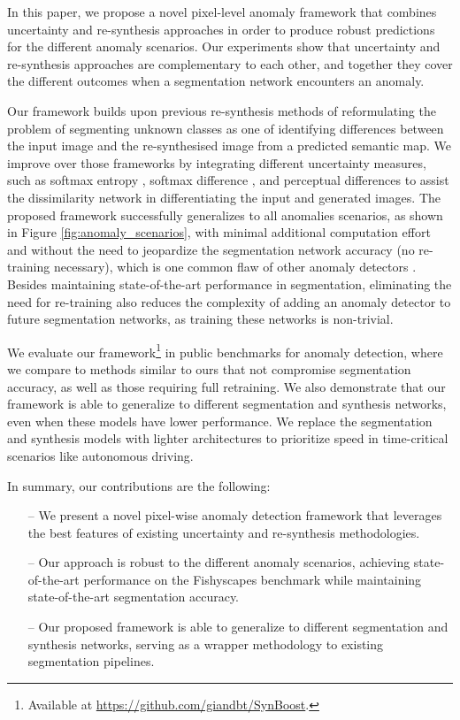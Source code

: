 \documentclass[final]{cvpr}
\begin{document}
In this paper, we propose a novel pixel-level anomaly framework that combines uncertainty and re-synthesis approaches in order to produce robust predictions for the different anomaly scenarios. Our experiments show that uncertainty and re-synthesis approaches are complementary to each other, and together they cover the different outcomes when a segmentation network encounters an anomaly.

Our framework builds upon previous re-synthesis methods \cite{epfl, master_thesis_old, synthesize_compare} of reformulating the problem of segmenting unknown classes as one of identifying differences between the input image and the re-synthesised image from a predicted semantic map. We improve over those frameworks by integrating different uncertainty measures, such as softmax entropy \cite{entropy, bayes_ensemble}, softmax difference \cite{meta}, and perceptual differences \cite{perceptual_diff, perceptual_diff_2} to assist the dissimilarity network in differentiating the input and generated images.
The proposed framework successfully generalizes to all anomalies scenarios, as shown in Figure \ref{fig:anomaly_scenarios}, with minimal additional computation effort and without the need to jeopardize the segmentation network accuracy (no re-training necessary), which is one common flaw of other anomaly detectors \cite{anomaly_score, prior_entropy, bayes_deep}. Besides maintaining state-of-the-art performance in segmentation, eliminating the need for re-training also reduces the complexity of adding an anomaly detector to future segmentation networks, as training these networks is non-trivial. 

We evaluate our framework\footnote{Available at \url{https://github.com/giandbt/SynBoost}.} in public benchmarks for anomaly detection, where we compare to methods similar to ours that not compromise segmentation accuracy, as well as those requiring full retraining. 
We also demonstrate that our framework is able to generalize to different segmentation and synthesis networks, even when these models have lower performance. We replace the segmentation and synthesis models with lighter architectures to prioritize speed in time-critical scenarios like autonomous driving. 





In summary, our contributions are the following:
\begin{itemize}
    \item[--] We present a novel pixel-wise anomaly detection framework that leverages the best features of existing uncertainty and re-synthesis methodologies.
    \item[--] Our approach is robust to the different anomaly scenarios, achieving state-of-the-art performance on the Fishyscapes benchmark while maintaining state-of-the-art segmentation accuracy.  
    \item[--] Our proposed framework is able to generalize to different segmentation and synthesis networks, serving as a wrapper methodology to existing segmentation pipelines.
\end{itemize}
\end{document}
